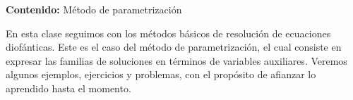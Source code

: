 {\Large\textbf{Contenido:} Método de parametrización}

En esta clase seguimos con los métodos básicos de resolución de ecuaciones diofánticas.
Este es el caso del método de parametrización, el cual consiste en expresar las familias de soluciones en términos de
variables auxiliares.
Veremos algunos ejemplos, ejercicios y problemas, con el propósito de afianzar lo aprendido hasta el momento.